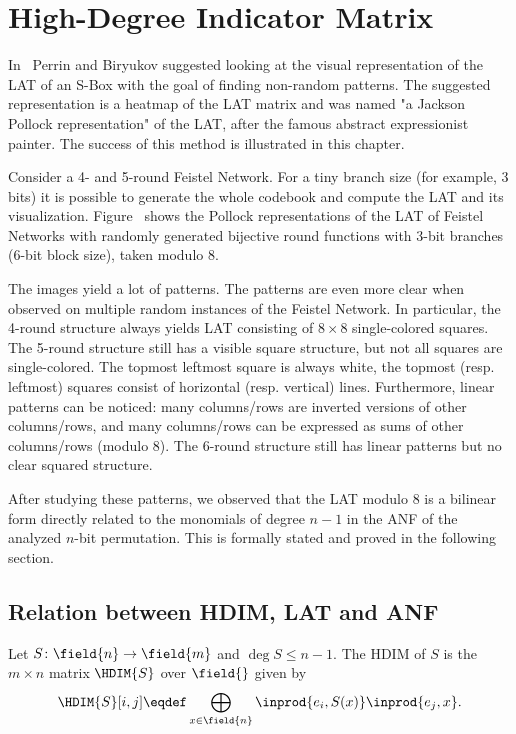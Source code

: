 \section{High-Degree Indicator Matrix}

In~\cite{LeoRE} Perrin and Biryukov suggested looking at the visual representation of the LAT of an S-Box with the goal of finding non-random patterns. The suggested representation is a heatmap of the LAT matrix and was named "a Jackson Pollock representation" of the LAT, after the famous abstract expressionist painter. The success of this method is illustrated in this chapter.

Consider a 4- and 5-round Feistel Network. For a tiny branch size (for example, 3 bits) it is possible to generate the whole codebook and compute the LAT and its visualization. Figure~ shows the Pollock representations of the LAT of Feistel Networks with randomly generated bijective round functions with 3-bit branches (6-bit block size), taken modulo 8.


The images yield a lot of patterns. The patterns are even more clear when observed on multiple random instances of the Feistel Network. In particular, the 4-round structure always yields LAT consisting of $8\times8$ single-colored squares. The 5-round structure still has a visible square structure, but not all squares are single-colored. The topmost leftmost square is always white, the topmost (resp. leftmost) squares consist of horizontal (resp. vertical) lines. Furthermore, linear patterns can be noticed: many columns/rows are inverted versions of other columns/rows, and many columns/rows can be expressed as sums of other columns/rows (modulo 8). The 6-round structure still has linear patterns but no clear squared structure.

After studying these patterns, we observed that the LAT modulo 8 is a bilinear form directly related to the monomials of degree $n-1$ in the ANF of the analyzed $n$-bit permutation. This is formally stated and proved in the following section.


\subsection{Relation between HDIM, LAT and ANF}

\begin{definition}[HDIM]
Let $S\colon \field{n} \to \field{m}$ and $\deg{S}\le n-1$. The HDIM of $S$ is the $m\times n$ matrix $\HDIM{S}$ over $\field{}$ given by
$$
\HDIM{S}[i,j] \eqdef \bigoplus_{x \in \field{n}} \inprod{e_i, S(x)}\inprod{e_j, x}.
$$
\end{definition}

